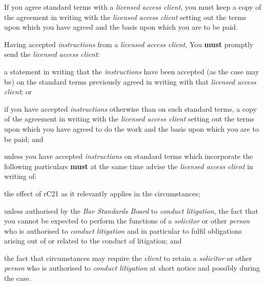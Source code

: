 If you agree standard terms with a \emph{licensed access client}, you
must keep a copy of the agreement in writing with the \emph{licensed
access client} setting out the terms upon which you have agreed and the
basis upon which you are to be paid.


Having accepted \emph{instructions} from a \emph{licensed access
client}, You \textcolor{myred}{\textbf{must}} promptly send the \emph{licensed access client}:
\begin{numlist}
\item a statement in writing that the \emph{instructions} have been
accepted (as the case may be) on the standard terms previously agreed in
writing with that \emph{licensed access client}; or

\item if you have accepted \emph{instructions} otherwise than on such
standard terms, a copy of the agreement in writing with the
\emph{licensed access client} setting out the terms upon which you have
agreed to do the work and the basis upon which you are to be paid; and

\item unless you have accepted \emph{instructions} on standard terms which
incorporate the following particulars \textcolor{myred}{\textbf{must}} at the same time advise the
\emph{licensed access client} in writing of:
\begin{alphlist}
\item the effect of rC21 as it relevantly applies in the circumstances;

\item unless authorised by the \emph{Bar Standards Board} to \emph{conduct
litigation}, the fact that you cannot be expected to perform the
functions of a \emph{solicitor} or other \emph{person} who is authorised
to \emph{conduct litigation} and in particular to fulfil obligations
arising out of or related to the conduct of litigation; and

\item the fact that circumstances may require the \emph{client} to retain a
\emph{solicitor} or other \emph{person} who is authorised to
\emph{conduct litigation} at short notice and possibly during the case.
\end{alphlist}\end{numlist}

